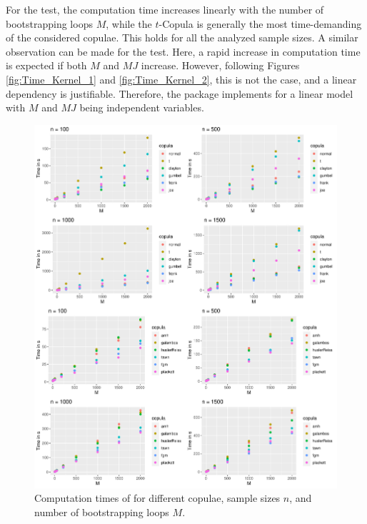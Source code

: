 \mycolor For the  test, the computation time increases linearly with the number of bootstrapping loops $M$, while the $t$-Copula is generally the most time-demanding of the considered copulae. \bk This holds for all the analyzed sample sizes. A similar observation can be made for the  test. Here, a rapid increase in computation time is expected if both $M$ and $MJ$ increase. However, following \mycolor Figures \ref{fig:Time_Kernel_1} and \ref{fig:Time_Kernel_2}, \bk this is not the case, and a linear dependency is justifiable. Therefore, the package implements for  a linear model with $M$ and $MJ$ being independent variables.
\begin{figure}[H]
    \centering
 \includegraphics[width=\textwidth]{img/Time_KendallKS.pdf}
	\caption{Computation times of \mycolor \protect{} \bk for different copulae, sample sizes $n$, and number of bootstrapping loops $M$.}
	\label{fig:Time_KendallKS}
\end{figure}


